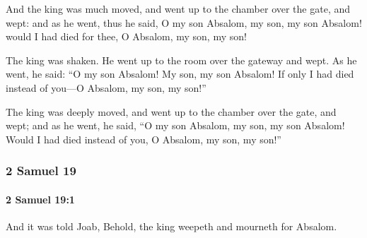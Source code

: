 			\begin{versebox}
					\item[BHS] 
					\item[ASV] And the king was much moved, and went up to the chamber over the gate, and wept: and as he went, thus he said, O my son Absalom, my son, my son Absalom! would I had died for thee, O Absalom, my son, my son!
					\item[NIV] The king was shaken. He went up to the room over the gateway and wept. As he went, he said: “O my son Absalom! My son, my son Absalom! If only I had died instead of you—O Absalom, my son, my son!”
					\item[NRSV] The king was deeply moved, and went up to the chamber over the gate, and wept; and as he went, he said, “O my son Absalom, my son, my son Absalom! Would I had died instead of you, O Absalom, my son, my son!”
			\end{versebox}
	\subsubsection{2 Samuel 19} %
		\label{2SAMUEL-19}

		\paragraph{2 Samuel 19:1} %
			\label{2SAMUEL-19-1}

			And it was told Joab, Behold, the king weepeth and mourneth for Absalom.

